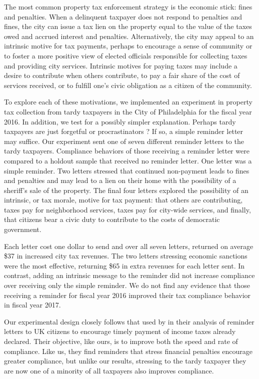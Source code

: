 \documentclass[12pt]{article}
\begin{document}
The most common property tax enforcement strategy is the economic
stick: fines and penalties.  When a delinquent taxpayer does not
respond to penalties and fines, the city can issue a tax lien on the
property equal to the value of the taxes owed and accrued interest and
penalties.  Alternatively, the city may appeal to an intrinsic motive
for tax payments, perhaps to encourage a sense of community or to
foster a more positive view of elected officials responsible for
collecting taxes and providing city services.  Intrinsic motives for
paying taxes may include a desire to contribute when others
contribute, to pay a fair share of the cost of services received, or
to fulfill one's civic obligation as a citizen of the community.

To explore each of these motivations, we implemented an experiment in
property tax collection from tardy taxpayers in the City of
Philadelphia for the fiscal year 2016.  In addition, we test for a
possibly simpler explanation.  Perhaps tardy taxpayers are just
forgetful \cite{Akerlof-91} or procrastinators \cite{DR-99}?  If so, a
simple reminder letter may suffice.  Our experiment sent one of seven
different reminder letters to the tardy taxpayers. Compliance
behaviors of those receiving a reminder letter were compared to a
holdout sample that received no reminder letter.  One letter was a
simple reminder. Two letters stressed that continued non-payment leads
to fines and penalties and may lead to a lien on their home with the
possibility of a sheriff's sale of the property.  The final four
letters explored the possibility of an intrinsic, or tax morale, motive
for tax payment: that others are contributing, taxes pay for
neighborhood services, taxes pay for city-wide services, and finally,
that citizens bear a civic duty to contribute to the costs of
democratic government.

Each letter cost one dollar to send and over all seven letters,
returned on average \$37 in increased city tax revenues.  The two
letters stressing economic sanctions were the most effective,
returning \$65 in extra revenues for each letter sent.  In contrast,
adding an intrinsic message to the reminder did not increase
compliance over receiving only the simple reminder.  We do not find
any evidence that those receiving a reminder for fiscal year 2016
improved their tax compliance behavior in fiscal year 2017.

Our experimental design closely follows that used by
 in their analysis of reminder letters to UK
citizens to encourage timely payment of income taxes already declared.
Their objective, like ours, is to improve both the speed and rate of compliance.
Like us, they find reminders that stress financial penalties encourage
greater compliance, but unlike our results, stressing to the tardy
taxpayer they are now one of a minority of all taxpayers also improves
compliance.
\end{document}
